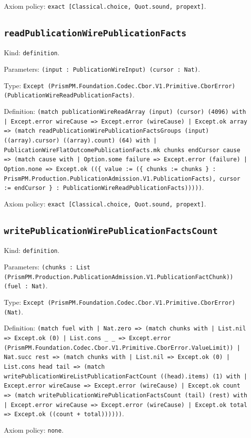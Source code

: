 \documentclass[11pt]{article}
\begin{document}
\noindent Axiom policy: \texttt{exact [Classical.choice, Quot.sound, propext]}.\par
\subsection*{\texttt{readPublicationWirePublicationFacts}}
\noindent Kind: \texttt{definition}.\par
\noindent Parameters: \texttt{(input : PublicationWireInput) (cursor : Nat)}.\par
\noindent Type: \texttt{Except (PrismPM.Foundation.Codec.Cbor.V1.Primitive.CborError) (PublicationWireReadPublicationFacts)}.\par
\noindent Definition: \texttt{(match publicationWireReadArray (input) (cursor) (4096) with | Except.error wireCause => Except.error (wireCause) | Except.ok array => (match readPublicationWirePublicationFactsGroups (input) ((array).cursor) ((array).count) (64) with | PublicationWireFlatOutcomePublicationFacts.mk chunks endCursor cause => (match cause with | Option.some failure => Except.error (failure) | Option.none => Except.ok ((\{ value := (\{ chunks := chunks \} : PrismPM.Production.PublicationAdmission.V1.PublicationFacts), cursor := endCursor \} : PublicationWireReadPublicationFacts)))))}.\par
\noindent Axiom policy: \texttt{exact [Classical.choice, Quot.sound, propext]}.\par
\subsection*{\texttt{writePublicationWirePublicationFactsCount}}
\noindent Kind: \texttt{definition}.\par
\noindent Parameters: \texttt{(chunks : List (PrismPM.Production.PublicationAdmission.V1.PublicationFactChunk)) (fuel : Nat)}.\par
\noindent Type: \texttt{Except (PrismPM.Foundation.Codec.Cbor.V1.Primitive.CborError) (Nat)}.\par
\noindent Definition: \texttt{(match fuel with | Nat.zero => (match chunks with | List.nil => Except.ok (0) | List.cons \_ \_ => Except.error (PrismPM.Foundation.Codec.Cbor.V1.Primitive.CborError.ValueLimit)) | Nat.succ rest => (match chunks with | List.nil => Except.ok (0) | List.cons head tail => (match writePublicationWireListPublicationFactCount ((head).items) (1) with | Except.error wireCause => Except.error (wireCause) | Except.ok count => (match writePublicationWirePublicationFactsCount (tail) (rest) with | Except.error wireCause => Except.error (wireCause) | Except.ok total => Except.ok ((count + total))))))}.\par
\noindent Axiom policy: \texttt{none}.\par
\end{document}

